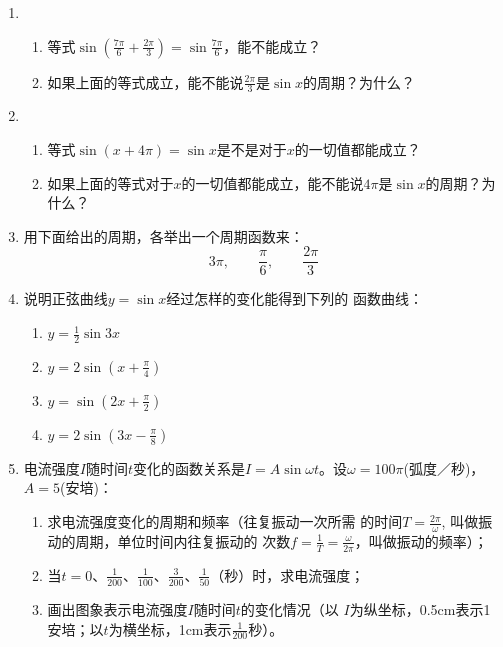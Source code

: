\begin{enumerate}
\item \begin{enumerate}
    \item 等式$\sin\left(\frac{7\pi}{6}+\frac{2\pi}{3}\right)=\sin\frac{7\pi}{6}$，能不能成立？
    \item 如果上面的等式成立，能不能说$\frac{2\pi}{3}$是$\sin x$的周期？为什么？
\end{enumerate}

\item \begin{enumerate}
    \item 等式$\sin(x+4\pi)=\sin x$是不是对于$x$的一切值都能成立？
    \item 如果上面的等式对于$x$的一切值都能成立，能不能说$4\pi$是$\sin x$的周期？为什么？
\end{enumerate}

\item 用下面给出的周期，各举出一个周期函数来：
\[3\pi,\qquad \frac{\pi}{6},\qquad \frac{2\pi}{3}\]

\item 说明正弦曲线$y=\sin x$经过怎样的变化能得到下列的
函数曲线：
\begin{multicols}{2}
\begin{enumerate}
    \item $y=\frac{1}{2}\sin 3x$
    \item $y=2\sin\left(x+\frac{\pi}{4}\right)$
    \item $y=\sin\left(2x+\frac{\pi}{2}\right)$
    \item $y=2\sin\left(3x-\frac{\pi}{8}\right)$
\end{enumerate}
\end{multicols}

\item 电流强度$I$随时间$t$变化的函数关系是$I=A\sin\omega t$。设$\omega=100\pi$(弧度／秒)，$A=5$(安培)：
\begin{enumerate}
    \item 求电流强度变化的周期和频率（往复振动一次所需
的时间$T=\frac{2\pi}{\omega}$, 叫做振动的周期，单位时间内往复振动的
次数$f=\frac{1}{T}=\frac{\omega}{2\pi}$，叫做振动的频率）；
\item 当$t=0$、$\frac{1}{200}$、$\frac{1}{100}$、$\frac{3}{200}$、$\frac{1}{50}$（秒）时，求电流强度；
\item 画出图象表示电流强度$I$随时间$t$的变化情况（以
$I$为纵坐标，0.5cm表示1安培；以$t$为横坐标，1cm表示$\frac{1}{200}$秒）。
\end{enumerate}


\end{enumerate}
